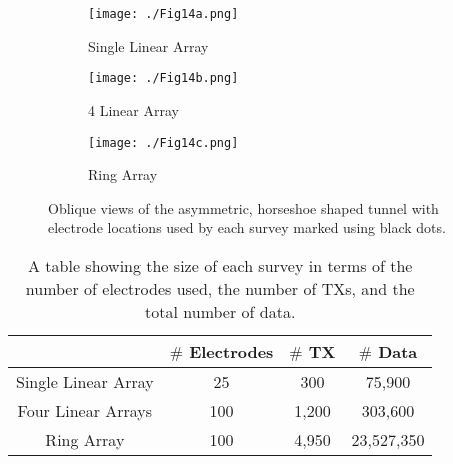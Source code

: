 \documentclass[preprint,authoryear,12pt]{elsarticle}
\begin{document}
\begin{figure}[htp]{}
   \begin{center}
      \begin{subfigure}{0.48\linewidth}
         \texttt{[image: ./Fig14a.png]}
         \caption{Single Linear Array}
         \label{fig:Horseshoe_SLA_Oblique}
      \end{subfigure}
      \hspace{-0.7cm}
      \qquad
      \begin{subfigure}{0.48\linewidth}
         \texttt{[image: ./Fig14b.png]}
         \caption{4 Linear Array}
         \label{fig:Horseshoe_4LA_Oblique}
      \end{subfigure}
      \vspace{0.4cm}

      \begin{subfigure}{0.48\linewidth}
         \texttt{[image: ./Fig14c.png]}
         \caption{Ring Array}
         \label{fig:Horseshoe_Ring_5mSep_Oblique}
      \end{subfigure}
   \end{center}
\vspace{-0.4cm}
\caption{Oblique views of the asymmetric, horseshoe shaped tunnel with electrode locations used by each survey marked using black dots.}
\label{fig:Horseshoe_SurveyGeometry}
\end{figure}


\begin{table} [htp]
   \footnotesize
    \begin{center}
        \begin{tabular}{| c | c | c | c |}
            \hline
             & \textbf{\mbox{\boldmath$\#$} Electrodes} & \textbf{\mbox{\boldmath$\#$} TX} & \textbf{\mbox{\boldmath$\#$} Data}\\
            \hline
            Single Linear Array & 25 & 300 & 75,900 \\
            \hline
            Four Linear Arrays & 100 & 1,200 & 303,600 \\
            \hline
            Ring Array & 100 & 4,950 & 23,527,350 \\
            \hline
        \end{tabular}
    \end{center}
\caption{A table showing the size of each survey in terms of the number of electrodes used, the number of TXs, and the total number of data.}
\label{table:SurveyDesign_Horseshoe_FullSurveyStats}
\end{table}
\end{document}
